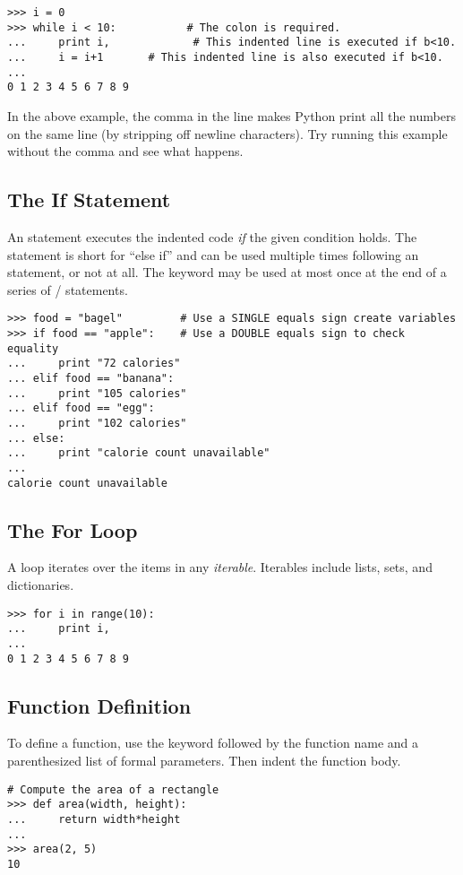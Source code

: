 \begin{lstlisting}
>>> i = 0
>>> while i < 10:           # The colon is required.
...     print i,             # This indented line is executed if b<10.
...     i = i+1       # This indented line is also executed if b<10.
...     
0 1 2 3 4 5 6 7 8 9
\end{lstlisting}
In the above example, the comma in the line  makes Python print all the numbers on the same line (by stripping off newline characters). Try running this example without the comma and see what happens.


\subsection*{The If Statement}
An  statement executes the 
indented code \emph{if} the given condition holds.
The  statement is short for ``else if'' and can be used multiple times following an  statement, or not at all. 
The  keyword may be used at most once at the end of a series of / statements.
\begin{lstlisting}
>>> food = "bagel"         # Use a SINGLE equals sign create variables
>>> if food == "apple":    # Use a DOUBLE equals sign to check equality
...     print "72 calories"
... elif food == "banana":
...     print "105 calories"
... elif food == "egg":
...     print "102 calories"
... else: 
...     print "calorie count unavailable"
...     
calorie count unavailable
\end{lstlisting}


\subsection*{The For Loop}
A  loop iterates over the items in any \emph{iterable}. Iterables include lists, sets, and dictionaries.

\begin{lstlisting}
>>> for i in range(10):
...     print i,
...     
0 1 2 3 4 5 6 7 8 9
\end{lstlisting}


\subsection*{Function Definition}
To define a function, use the  keyword followed by the function name and a parenthesized list of formal parameters. Then indent the function body.
\begin{lstlisting}
# Compute the area of a rectangle
>>> def area(width, height):
...     return width*height
...         
>>> area(2, 5)
10
\end{lstlisting}

